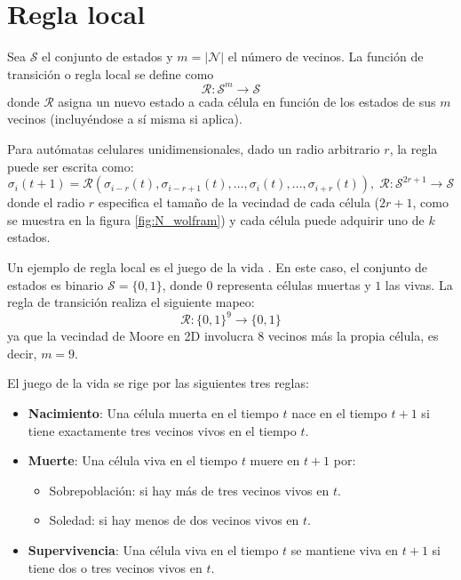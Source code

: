 \section{Regla local}

Sea $\mathcal{S}$ el conjunto de estados y $m = |\mathcal{N}|$ el número de vecinos. La función de transición o regla local se define como 
\[
\mathcal{R}: \mathcal{S}^m \to \mathcal{S}
\] 
donde $\mathcal{R}$ asigna un nuevo estado a cada célula en función de los estados de sus $m$ vecinos (incluyéndose a sí misma si aplica).

Para autómatas celulares unidimensionales, dado un radio arbitrario $r$, la regla puede ser escrita como:
\[
\sigma_{i}(t + 1) = \mathcal{R}(\sigma_{i-r}(t), \sigma_{i-r+1} (t), \dots, \sigma_{i}(t), \dots, \sigma_{i+r} (t)), \; \mathcal{R}: \mathcal{S}^{2r + 1} \to \mathcal{S}
\]
donde el radio $r$ especifica el tamaño de la vecindad de cada célula ($2r + 1$, como se muestra en la figura \ref{fig:N_wolfram}) y cada célula puede adquirir uno de $k$ estados.

Un ejemplo de regla local es el juego de la vida \cite{lifewiki_life}. En este caso, el conjunto de estados es binario $\mathcal{S} = \{ 0, 1 \}$, donde $0$ representa células muertas y $1$ las vivas. La regla de transición realiza el siguiente mapeo:
\[
\mathcal{R}: \{ 0, 1 \}^9 \to \{ 0, 1\}
\]
ya que la vecindad de Moore en 2D involucra 8 vecinos más la propia célula, es decir, $m = 9$. 

El juego de la vida se rige por las siguientes tres reglas:

\begin{itemize}
	
	\item \textbf{Nacimiento}: Una célula muerta en el tiempo $t$ nace en el tiempo $t + 1$ si tiene exactamente tres vecinos vivos en el tiempo $t$.
	\item \textbf{Muerte}: Una célula viva en el tiempo $t$ muere en $t + 1$ por:
	\begin{itemize}
		\item Sobrepoblación: si hay más de tres vecinos vivos en $t$.
		\item Soledad: si hay menos de dos vecinos vivos en $t$.
	\end{itemize}
	\item \textbf{Supervivencia}: Una célula viva en el tiempo $t$ se mantiene viva en $t + 1$ si tiene dos o tres vecinos vivos en $t$.	 
\end{itemize}

